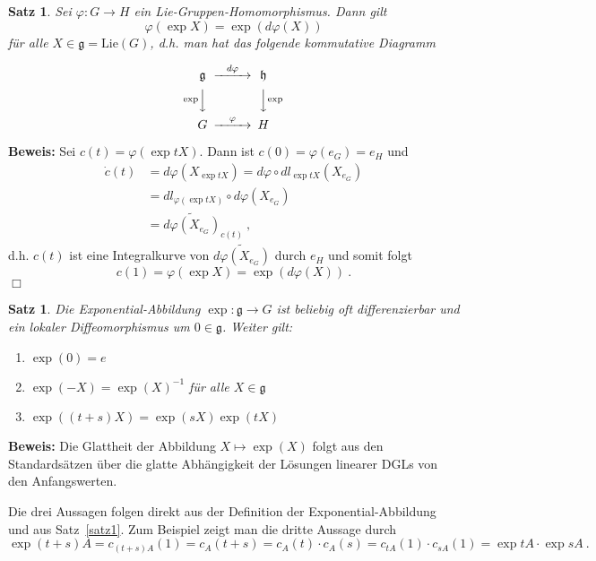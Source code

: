 \documentclass[12pt,a4paper]{article}
\def\Lie{\mathrm{Lie}}
\def\g{\mathfrak{g}}
\newtheorem{Satz}[Lemma]{Satz}
\def\proof{\noindent\textbf{Beweis:}\quad}
\def\qed{\quad\hfill\ensuremath{\Box}}
\begin{document}
\begin{Satz}
Sei $\varphi : G\rightarrow H$ ein Lie-Gruppen-Homomorphismus. Dann gilt
$$
\varphi (\exp X) = \exp (d\varphi(X))
$$
f\"ur alle $X\in \g = \Lie(G)$, d.h. man hat das folgende kommutative Diagramm

\begin{equation*}
\begin{CD}
\mathfrak{g} @> d\varphi>> \mathfrak{h}\\
@V\exp VV @VV {\exp}V \\
G @>\varphi>> H
\end{CD}
\end{equation*}





\end{Satz}
\proof
Sei $c(t)= \varphi (\exp tX)$. Dann ist $c(0) = \varphi(e_G)=e_H$ und
$$
\begin{array}{rl}
\dot c(t) &= d\varphi (X_{\exp tX}) = d\varphi \circ dl_{\exp t X} (X_{e_G})\\[1.5ex]
&= dl_{\varphi(\exp tX)} \circ d\varphi (X_{e_G})\\[1.5ex]
&= \widetilde{d\varphi (X_{e_G})}_{c(t)} \ ,
\end{array}
$$
d.h. $c(t)$ ist eine Integralkurve von $\widetilde{d\varphi (X_{e_G})}$ durch $e_H$ und
somit folgt
$$
c(1) = \varphi(\exp X) = \exp (d\varphi (X)) \ .
$$
\qed

\begin{Satz}
Die Exponential-Abbildung $\exp : \g \rightarrow G$ ist beliebig oft differenzierbar
und ein lokaler Diffeomorphismus um $0\in \g$. Weiter gilt:
\begin{enumerate}
\item
$\exp(0) = e$
\item
$\exp (-X)= \exp(X)^{-1}$  f\"ur alle $X\in \g$
\item
$
\exp((t+s)X) = \exp(sX) \exp(tX)
$
\end{enumerate}
\end{Satz}
\proof
Die Glattheit der Abbildung $X \mapsto \exp (X)$ folgt aus den Standards\"atzen \"uber die glatte
Abh\"angigkeit der L\"osungen linearer DGLs von den Anfangswerten.

\medskip

Die drei Aussagen folgen direkt aus der Definition der Exponential-Abbildung  und aus Satz~\ref{satz1}.
Zum Beispiel zeigt man die dritte Aussage durch
$$
\exp(t+s)A = c_{(t+s)A}(1)= c_A(t+s) =c_A(t)\cdot c_A(s) = c_{tA}(1)\cdot c_{sA}(1) = \exp tA \cdot \exp sA \ .
$$
\end{document}
